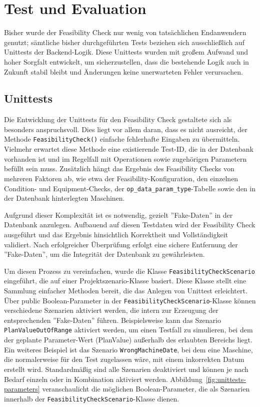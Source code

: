 \chapter{Test und Evaluation}

Bisher wurde der Feasibility Check nur wenig von tatsächlichen Endanwendern genutzt; sämtliche bisher durchgeführten Tests beziehen sich ausschließlich auf Unittests der Backend-Logik. Diese Unittests wurden mit großem Aufwand und hoher Sorgfalt entwickelt, um sicherzustellen, dass die bestehende Logik auch in Zukunft stabil bleibt und Änderungen keine unerwarteten Fehler verursachen.

\section{Unittests}

Die Entwicklung der Unittests für den Feasibility Check gestaltete sich als besonders anspruchsvoll. Dies liegt vor allem daran, dass es nicht ausreicht, der Methode \texttt{FeasibilityCheck()} einfache fehlerhafte Eingaben zu übermitteln. Vielmehr erwartet diese Methode eine existierende Test-ID, die in der Datenbank vorhanden ist und im Regelfall mit Operationen sowie zugehörigen Parametern befüllt sein muss. Zusätzlich hängt das Ergebnis des Feasibility Checks von mehreren Faktoren ab, wie etwa der Feasibility-Konfiguration, den einzelnen Condition- und Equipment-Checks, der \texttt{op\_data\_param\_type}-Tabelle sowie den in der Datenbank hinterlegten Maschinen.

Aufgrund dieser Komplexität ist es notwendig, gezielt ''Fake-Daten'' in der Datenbank anzulegen. Aufbauend auf diesen Testdaten wird der Feasibility Check ausgeführt und das Ergebnis hinsichtlich Korrektheit und Vollständigkeit validiert. Nach erfolgreicher Überprüfung erfolgt eine sichere Entfernung der ''Fake-Daten'', um die Integrität der Datenbank zu gewährleisten.

Um diesen Prozess zu vereinfachen, wurde die Klasse \texttt{FeasibilityCheckScenario} eingeführt, die auf einer Projektszenario-Klasse basiert. Diese Klasse stellt eine Sammlung einfacher Methoden bereit, die das Anlegen von Unittest erleichtert. Über public Boolean-Parameter in der \texttt{FeasibilityCheckScenario}-Klasse können verschiedene Szenarien aktiviert werden, die intern zur Erzeugung der entsprechenden ''Fake-Daten'' führen. Beispielsweise kann das Szenario \texttt{PlanValueOutOfRange} aktiviert werden, um einen Testfall zu simulieren, bei dem der geplante Parameter-Wert (PlanValue) außerhalb des erlaubten Bereichs liegt. Ein weiteres Beispiel ist das Szenario \texttt{WrongMachineDate}, bei dem eine Maschine, die normalerweise für den Test zugelassen wäre, mit einem inkorrekten Datum erstellt wird. Standardmäßig sind alle Szenarien deaktiviert und können je nach Bedarf einzeln oder in Kombination aktiviert werden. Abbildung~\ref{fig:unittests-parameters} veranschaulicht die möglichen Boolean-Parameter, die als Szenarien innerhalb der \texttt{FeasibilityCheckScenario}-Klasse dienen.

